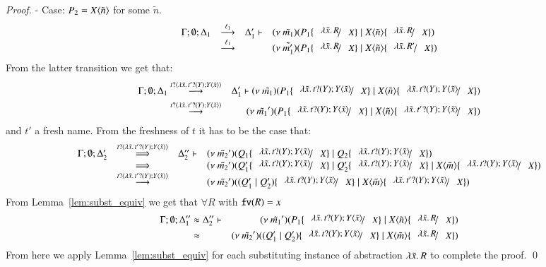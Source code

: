 \begin{proof}
	\noi - Case: $P_2 = X\langle \tilde{n} \rangle$ for some $\tilde{n}$.
%
\[
	\mhorel	{\Gamma}{\Delta_1}{\newsp{\tilde{m_1}}{P_1 \subst{\abs{\tilde{x}}{R}}{X} \Par \appl{X}{\tilde{n}} \subst{\abs{\tilde{x}}{R}}{X}}}
		{\by{\ell_1}}{\Delta_1'}{}{\newsp{\tilde{m_1'}}{P_1 \subst{\abs{\tilde{x}}{R}}{X} \Par \appl{X}{\tilde{n}} \subst{\abs{\tilde{x}}{R'}}{X}}}
\]
%
	\noi From the latter transition we get that:
%
	\begin{eqnarray}
		\Gamma; \es; \Delta_1 &\by{\bactinp{t}{\abs{\tilde{x}}{\binp{t'}{Y} \appl{Y}{\tilde{x}}}}}& \Delta_1' \proves
		\newsp{\tilde{m_1}}{P_1 \subst{\abs{\tilde{x}}{\binp{t}{Y} \appl{Y}{\tilde{x}}}}{X} \Par \appl{X}{\tilde{n}} \subst{\abs{\tilde{x}}{\binp{t}{Y} \appl{Y}{\tilde{x}}}}{X}}
		\nonumber \\
		&\by{\bactinp{t}{\abs{\tilde{x}}{\binp{t'}{Y} \appl{Y}{\tilde{x}}}}}& 
		\newsp{\tilde{m_1}'}{P_1 \subst{\abs{\tilde{x}}{\binp{t}{Y} \appl{Y}{\tilde{x}}}}{X} \Par \appl{X}{\tilde{n}} \subst{\abs{\tilde{x}}{\binp{t'}{Y} \appl{Y}{\tilde{x}}}}{X}}
		\label{cor:subst_equiv5}
	\end{eqnarray}
%
	\noi and $t'$ a fresh name. From the freshness of $t$
	it has to be the case that:
%
\[
	\begin{array}{rcll}
		\Gamma; \es; \Delta_2' &\By{\bactinp{t}{\abs{\tilde{x}}{\binp{t'}{Y} \appl{Y}{\tilde{x}}}}}& \Delta_2'' \proves &
		\newsp{\tilde{m_2}'}{Q_1 \subst{\abs{\tilde{x}}{\binp{t}{Y} \appl{Y}{\tilde{x}}}}{X} \Par Q_2 \subst{\abs{\tilde{x}}{\binp{t}{Y} \appl{Y}{\tilde{x}}}}{X}}\\
		&\By{}& &
		\newsp{\tilde{m_2}'}{Q_1' \subst{\abs{\tilde{x}}{\binp{t}{Y} \appl{Y}{\tilde{x}}}}{X} \Par Q_2' \subst{\abs{\tilde{x}}{\binp{t}{Y} \appl{Y}{\tilde{x}}}}{X} \Par \appl{X}{\tilde{m}} \subst{\abs{\tilde{x}}{\binp{t}{Y} \appl{Y}{\tilde{x}}}}{X}} \\
		&\by{\bactinp{t}{\abs{\tilde{x}}{\binp{t'}{Y} \appl{Y}{\tilde{x}}}}}& &
		\newsp{\tilde{m_2}'}{(Q_1' \Par Q_2') \subst{\abs{\tilde{x}}{\binp{t}{Y} \appl{Y}{\tilde{x}}}}{X} \Par \appl{X}{\tilde{m}} \subst{\abs{\tilde{x}}{\binp{t'}{Y} \appl{Y}{\tilde{x}}}}{X}}
	\end{array}
\]
%
	\noi From Lemma~\ref{lem:subst_equiv} we get that $\forall R$ with $\mathtt{fv}(R) = x$
%
	\begin{eqnarray}
		\Gamma; \es; \Delta_1'' &\wb \Delta_2'' \proves&
		\newsp{\tilde{m_1}'}{P_1 \subst{\abs{\tilde{x}}{\binp{t}{Y} \appl{Y}{\tilde{x}}}}{X} \Par \appl{X}{\tilde{n}} \subst{\abs{\tilde{x}}{R}}{X}} \nonumber \\
		&\wb& \newsp{\tilde{m_2}'}{(Q_1' \Par Q_2') \subst{\abs{\tilde{x}}{\binp{t}{Y} \appl{Y}{\tilde{x}}}}{X} \Par \appl{X}{\tilde{m}} \subst{\abs{\tilde{x}}{R}}{X}}
		\label{cor:subst_equiv6}
	\end{eqnarray} 
%
	\noi From here we apply Lemma~\ref{lem:subst_equiv} for each substituting instance of
	abstraction $\lambda \tilde{x}.\,R$ to complete the proof.
	\qed
\end{proof}

